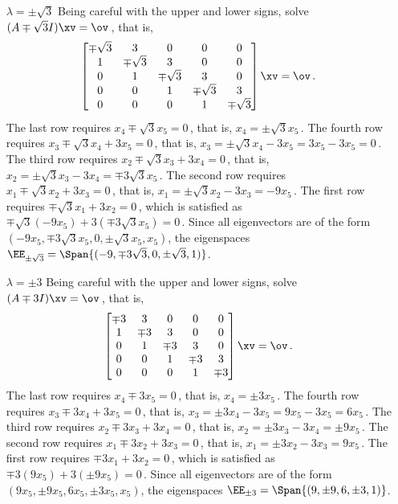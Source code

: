 \begin{example}
\begin{solution}
\begin{enumerate}
\begin{itemize}
\item[\(\lambda=\pm\sqrt3\)]  Being careful with the upper and lower signs, solve \((A\mp\sqrt3I)\xv=\ov\)\,, that is,
\begin{equation*}
\begin{bmatrix}\mp\sqrt3&3&0&0&0
\\1&\mp\sqrt3&3&0&0
\\0&1&\mp\sqrt3&3&0
\\0&0&1&\mp\sqrt3&3
\\0&0&0&1&\mp\sqrt3\end{bmatrix}\xv=\ov\,.
\end{equation*}
The last row requires \(x_4\mp\sqrt3x_5=0\)\,, that is, \(x_4=\pm\sqrt3x_5\)\,.
The fourth row requires \(x_3\mp\sqrt3x_4+3x_5=0\)\,, that is, \(x_3=\pm\sqrt3x_4-3x_5=3x_5-3x_5=0\)\,.
The third row requires \(x_2\mp\sqrt3x_3+3x_4=0\)\,, that is, \(x_2=\pm\sqrt3x_3-3x_4=\mp3\sqrt3x_5\)\,.
The second row requires \(x_1\mp\sqrt3x_2+3x_3=0\)\,, that is, \(x_1=\pm\sqrt3x_2-3x_3=-9x_5\)\,.
The first row requires \(\mp\sqrt3x_1+3x_2=0\)\,, which is satisfied as \(\mp\sqrt3(-9x_5)+3(\mp3\sqrt3x_5)=0\)\,.
Since all eigenvectors are of the form \((-9x_5, \mp3\sqrt3x_5, 0, \pm\sqrt3x_5, x_5)\), the eigenspaces \(\EE_{\pm\sqrt3}=\Span\{(-9,\mp3\sqrt3,0,\pm\sqrt3,1)\}\).

\item[\(\lambda=\pm3\)]  Being careful with the upper and lower signs, solve \((A\mp3I)\xv=\ov\)\,, that is,
\begin{equation*}
\begin{bmatrix}\mp3&3&0&0&0
\\1&\mp3&3&0&0
\\0&1&\mp3&3&0
\\0&0&1&\mp3&3
\\0&0&0&1&\mp3\end{bmatrix}\xv=\ov\,.
\end{equation*}
The last row requires \(x_4\mp3x_5=0\)\,, that is, \(x_4=\pm3x_5\)\,.
The fourth row requires \(x_3\mp3x_4+3x_5=0\)\,, that is, \(x_3=\pm3x_4-3x_5=9x_5-3x_5=6x_5\)\,.
The third row requires \(x_2\mp3x_3+3x_4=0\)\,, that is, \(x_2=\pm3x_3-3x_4=\pm9x_5\)\,.
The second row requires \(x_1\mp3x_2+3x_3=0\)\,, that is, \(x_1=\pm3x_2-3x_3=9x_5\)\,.
The first row requires \(\mp3x_1+3x_2=0\)\,, which is satisfied as \(\mp3(9x_5)+3(\pm9x_5)=0\)\,.
Since all eigenvectors are of the form \((9x_5, \pm9 x_5, 6x_5, \pm3x_5, x_5)\), the eigenspaces \(\EE_{\pm3}=\Span\{(9,\pm9,6,\pm3,1)\}\).

\end{itemize}
\end{enumerate}
\end{solution}
\end{example}


